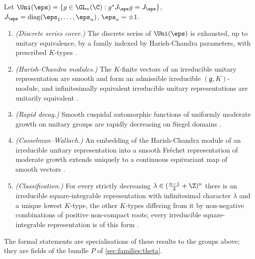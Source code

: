 \begin{littheorem}\label{pf:rows:arch}
Let $\Uni(\eps)=\{g\in\GL_n(\C):g^*J_\eps g=J_\eps\}$, $J_\eps=\mathrm{diag}(\eps_1,\dots,\eps_n)$, $\eps_a=\pm1$.
\begin{enumerate}[label=(\arabic*)]
\item \emph{(Discrete series cover.)} The discrete series of $\Uni(\eps)$ is exhausted, up to unitary equivalence, by
a family indexed by Harish-Chandra parameters, with prescribed $K$-types \cite{HarishChandra1966}.
\item \emph{(Harish-Chandra modules.)} The $K$-finite vectors of an irreducible unitary representation are smooth and
form an admissible irreducible $(\mathfrak g,K)$-module, and infinitesimally equivalent irreducible unitary
representations are unitarily equivalent \cite{HarishChandra1966,Wallach1992}.
\item \emph{(Rapid decay.)} Smooth cuspidal automorphic functions of uniformly moderate growth on unitary groups are
rapidly decreasing on Siegel domains \cite{HarishChandra1968,BorelJacquet1979}.
\item \emph{(Casselman--Wallach.)} An embedding of the Harish-Chandra module of an irreducible unitary representation
into a smooth Fr\'echet representation of moderate growth extends uniquely to a continuous equivariant map of smooth
vectors \cite{Casselman1989,Wallach1992}.
\item \emph{(Classification.)} For every strictly decreasing $\lambda\in(\frac{n-1}2+\Z)^n$ there is an irreducible
square-integrable representation with infinitesimal character $\lambda$ and a unique lowest $K$-type, the other
$K$-types differing from it by non-negative combinations of positive non-compact roots; every irreducible
square-integrable representation is of this form \cite{HarishChandra1966,HechtSchmid1975}.
\end{enumerate}
\end{littheorem}

The formal statements are specialisations of these results to the groups above; they are fields of the bundle $P$ of
\cref{sec:families:theta}.

